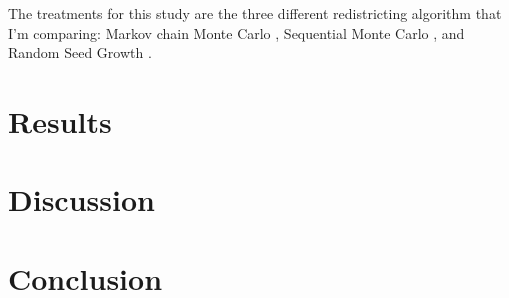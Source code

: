 \documentclass[stu, floatsintext]{apa7}
\begin{document}
The treatments for this study are the three different redistricting algorithm that I'm comparing: Markov chain Monte Carlo \parencite{fifield2020}, Sequential Monte Carlo \parencite{mccartan2020}, and Random Seed Growth \parencite{chen2013}.

\section{Results}

\section{Discussion}

\section{Conclusion}
\printbibliography
\end{document}

